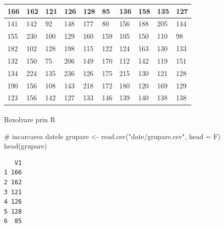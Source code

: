 \documentclass[
  11pt,
  b5paper,
  nottoc]{book}
\makeatletter
\let\oldparagraph\paragraph
\renewcommand{\paragraph}{
    \@ifstar
      \xxxParagraphStar
      \xxxParagraphNoStar
  }
\newcommand{\xxxParagraphStar}[1]{\oldparagraph*{#1}\mbox{}}
\newcommand{\xxxParagraphNoStar}[1]{\oldparagraph{#1}\mbox{}}
\newenvironment{Shaded}{\begin{snugshade}}{\end{snugshade}}
\newcommand{\AttributeTok}[1]{\textcolor[rgb]{0.40,0.45,0.13}{#1}}
\newcommand{\CommentTok}[1]{\textcolor[rgb]{0.37,0.37,0.37}{#1}}
\newcommand{\DecValTok}[1]{\textcolor[rgb]{0.68,0.00,0.00}{#1}}
\newcommand{\FunctionTok}[1]{\textcolor[rgb]{0.28,0.35,0.67}{#1}}
\newcommand{\NormalTok}[1]{\textcolor[rgb]{0.00,0.23,0.31}{#1}}
\newcommand{\OtherTok}[1]{\textcolor[rgb]{0.00,0.23,0.31}{#1}}
\newcommand{\SpecialCharTok}[1]{\textcolor[rgb]{0.37,0.37,0.37}{#1}}
\newcommand{\StringTok}[1]{\textcolor[rgb]{0.13,0.47,0.30}{#1}}
\makeatother
\begin{document}
\begin{table}[]
\begin{tabular}{|l|l|l|l|l|l|l|l|l|l|}
\hline
166 & 162 & 121 & 126 & 128 & 85  & 136 & 158 & 135 & 127 \\ \hline
141 & 142 & 92  & 148 & 177 & 80  & 156 & 188 & 205 & 144 \\ \hline
155 & 230 & 100 & 129 & 160 & 159 & 105 & 150 & 110 & 98  \\ \hline
182 & 102 & 128 & 198 & 115 & 122 & 124 & 163 & 130 & 133 \\ \hline
132 & 150 & 75  & 206 & 149 & 170 & 112 & 142 & 119 & 151 \\ \hline
134 & 224 & 135 & 236 & 126 & 175 & 215 & 130 & 121 & 128 \\ \hline
190 & 156 & 108 & 143 & 218 & 172 & 180 & 120 & 169 & 129 \\ \hline
123 & 156 & 142 & 127 & 133 & 146 & 139 & 140 & 138 & 138 \\ \hline
\end{tabular}
\end{table}

\paragraph{Rezolvare prin R}\label{rezolvare-prin-r-1}

\begin{Shaded}
\begin{Highlighting}[]
\CommentTok{\# incarcarea datele}
\NormalTok{grupare }\OtherTok{\textless{}{-}} \FunctionTok{read.csv}\NormalTok{(}\StringTok{"date/grupare.csv"}\NormalTok{, }\AttributeTok{head =}\NormalTok{ F)}
\FunctionTok{head}\NormalTok{(grupare)}
\end{Highlighting}
\end{Shaded}

\begin{verbatim}
   V1
1 166
2 162
3 121
4 126
5 128
6  85
\end{verbatim}

\begin{Shaded}
\end{Shaded}
\end{document}
